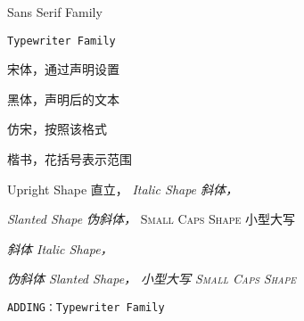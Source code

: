 \documentclass[fontset=windows]{article}
\begin{document}
 \textsf{Sans Serif Family}


 \texttt{Typewriter Family} \par
 
 {\songti 宋体，通过声明设置} \par
 {\heiti 黑体，声明后的文本} \par
 {\fangsong 仿宋，按照该格式} \par
 {\kaishu 楷书，花括号表示范围} \par

   \textup{Upright Shape 直立，}	
   \textit{Italic Shape 斜体，} \par
   \textsl{Slanted Shape 伪斜体，}
   \textsc{Small Caps Shape 小型大写} \par
   
   \itshape{斜体 Italic Shape，}	\par
   \slshape{伪斜体 Slanted Shape，}	
   \scshape{小型大写 Small Caps Shape}

   \slshape{\texttt{ADDING：Typewriter Family} \par\par}	
\end{document}
